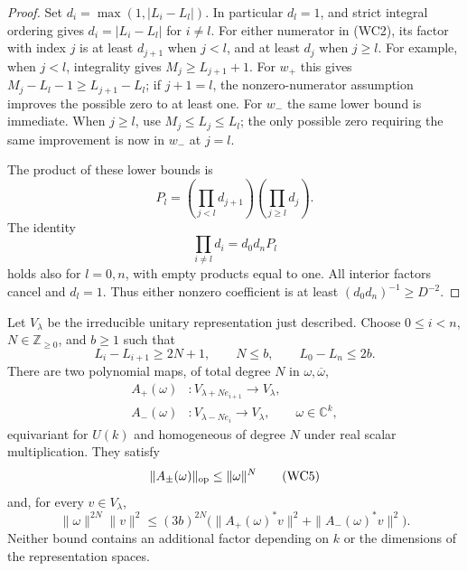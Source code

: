 \begin{proof}
Set \(d_i=\max(1,|L_i-L_l|)\). In particular \(d_l=1\),
and strict integral ordering gives \(d_i=|L_i-L_l|\) for \(i\ne l\).
For either numerator in (WC2), its factor with index \(j\) is at least
\(d_{j+1}\) when \(j<l\), and at least \(d_j\) when \(j\ge l\).
For example, when \(j<l\), integrality gives
\(M_j\ge L_{j+1}+1\). For \(w_+\) this gives
\(M_j-L_l-1\ge L_{j+1}-L_l\); if \(j+1=l\), the
nonzero-numerator assumption improves the possible zero to at least
one. For \(w_-\) the same lower bound is immediate. When \(j\ge l\),
use \(M_j\le L_j\le L_l\); the only possible zero requiring the
same improvement is now in \(w_-\) at \(j=l\).

The product of these lower bounds is
\[
 P_l=\left(\prod_{j<l}d_{j+1}\right)
                   \left(\prod_{j\ge l}d_j\right).
\]
The identity
\[
             \prod_{i\ne l}d_i=d_0d_nP_l
                                                        \tag{WC3}
\]
holds also for \(l=0,n\), with empty products equal to one.
All interior factors cancel and \(d_l=1\). Thus either nonzero
coefficient is at least \((d_0d_n)^{-1}\ge D^{-2}\).
\end{proof}

\begin{theorem}
\label{thm:wigner-two-chain-lower}
Let \(V_\lambda\) be the irreducible unitary representation just
described. Choose \(0\le i<n\), \(N\in\mathbb Z_{\ge0}\), and
\(b\ge1\) such that
\[
 L_i-L_{i+1}\ge2N+1,\qquad N\le b,
                    \qquad L_0-L_n\le2b .              \tag{WC4}
\]
There are two polynomial maps, of total degree \(N\) in
\(\omega,\overline\omega\),
\[
 \begin{split}
 A_+(\omega)&:V_{\lambda+Ne_{i+1}}\longrightarrow V_\lambda,\\
 A_-(\omega)&:V_{\lambda-Ne_i}\longrightarrow V_\lambda,
 \qquad \omega\in\mathbb C^k,
 \end{split}
\]
equivariant for \(U(k)\) and homogeneous of degree \(N\) under
real scalar multiplication. They satisfy
\[
                  \|A_\pm(\omega)\|_{\rm op}
                                  \le\|\omega\|^N       \tag{WC5}
\]
and, for every \(v\in V_\lambda\),
\[
 \|\omega\|^{2N}\|v\|^2
 \le(3b)^{2N}
       \bigl(\|A_+(\omega)^*v\|^2+
                         \|A_-(\omega)^*v\|^2\bigr).    \tag{WC6}
\]
Neither bound contains an additional factor depending on \(k\) or
the dimensions of the representation spaces.
\end{theorem}

